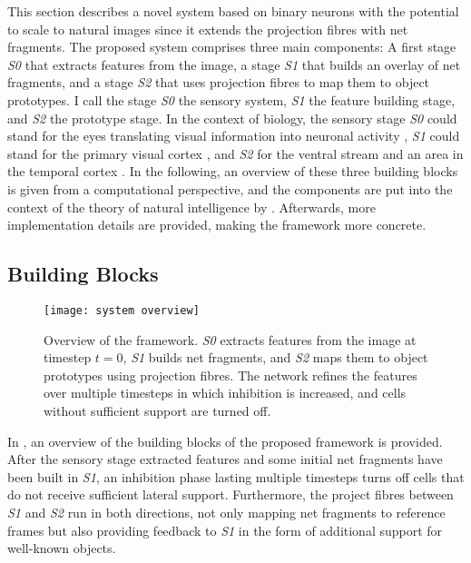 This section describes a novel system based on binary neurons with the potential to scale to natural images since it extends the projection fibres with net fragments.
The proposed system comprises three main components: A first stage \emph{S0} that extracts features from the image, a stage \emph{S1} that builds an overlay of net fragments, and a stage \emph{S2} that uses projection fibres to map them to object prototypes.
I call the stage \emph{S0} the sensory system, \emph{S1} the feature building stage, and \emph{S2} the prototype stage.
In the context of biology, the sensory stage \emph{S0} could stand for the eyes translating visual information into neuronal activity , \emph{S1} could stand for the primary visual cortex , and \emph{S2} for the ventral stream  and an area in the temporal cortex \cite{miyashita_inferior_1993}.
In the following, an overview of these three building blocks is given from a computational perspective, and the components are put into the context of the theory of natural intelligence by .
Afterwards, more implementation details are provided, making the framework more concrete.

\subsection{Building Blocks}
\begin{figure}[h]
    \centering
    \texttt{[image: system overview]}
    \caption[Overview of the framework]{Overview of the framework. \emph{S0} extracts features from the image at timestep $t=0$, \emph{S1} builds net fragments, and \emph{S2} maps them to object prototypes using projection fibres. The network refines the features over multiple timesteps in which inhibition is increased, and cells without sufficient support are turned off.}
\end{figure}

In , an overview of the building blocks of the proposed framework is provided. After the sensory stage extracted features and some initial net fragments have been built in \emph{S1}, an inhibition phase  lasting multiple timesteps turns off cells that do not receive sufficient lateral support. Furthermore, the project fibres  between \emph{S1} and \emph{S2} run in both directions, not only mapping net fragments to reference frames but also providing feedback to \emph{S1} in the form of additional support for well-known objects.

